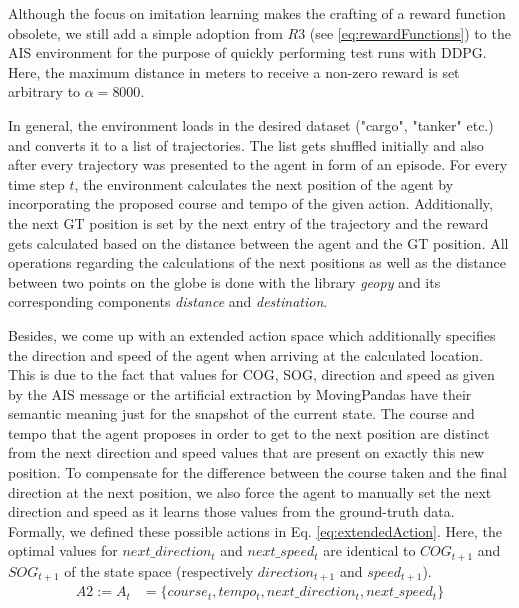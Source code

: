 Although the focus on imitation learning makes the crafting of a reward function obsolete, we still add a simple adoption from $R3$ (see \ref{eq:rewardFunctions}) to the AIS environment for the purpose of quickly performing test runs with DDPG. Here, the maximum distance in meters to receive a non-zero reward is set arbitrary to $\alpha=8000$.
\par
In general, the environment loads in the desired dataset ("cargo", "tanker" etc.) and converts it to a list of trajectories. The list gets shuffled initially and also after every trajectory was presented to the agent in form of an episode. For every time step $t$, the environment calculates the next position of the agent by incorporating the proposed course and tempo of the given action. Additionally, the next GT position is set by the next entry of the trajectory and the reward gets calculated based on the distance between the agent and the GT position. All operations regarding the calculations of the next positions as well as the distance between two points on the globe is done with the library \textit{geopy} and its corresponding components \textit{distance} and \textit{destination}.
\par
Besides, we come up with an extended action space which additionally specifies the direction and speed of the agent when arriving at the calculated location. This is due to the fact that values for COG, SOG, direction and speed as given by the AIS message or the artificial extraction by MovingPandas have their semantic meaning just for the snapshot of the current state. The course and tempo that the agent proposes in order to get to the next position are distinct from the next direction and speed values that are present on exactly this new position. To compensate for the difference between the course taken and the final direction at the next position, we also force the agent to manually set the next direction and speed as it learns those values from the ground-truth data. Formally, we defined these possible actions in Eq.  \ref{eq:extendedAction}. Here, the optimal values for $next\_direction_t$ and $next\_speed_t$ are identical to $COG_{t+1}$ and $SOG_{t+1}$ of the state space (respectively $direction_{t+1}$ and $speed_{t+1}$).
\begin{equation}
\begin{aligned}
    A2 := A_t &= \{course_t, tempo_t, next\_direction_t, next\_speed_t\}
    \end{aligned}
    \label{eq:extendedAction}
\end{equation} 

